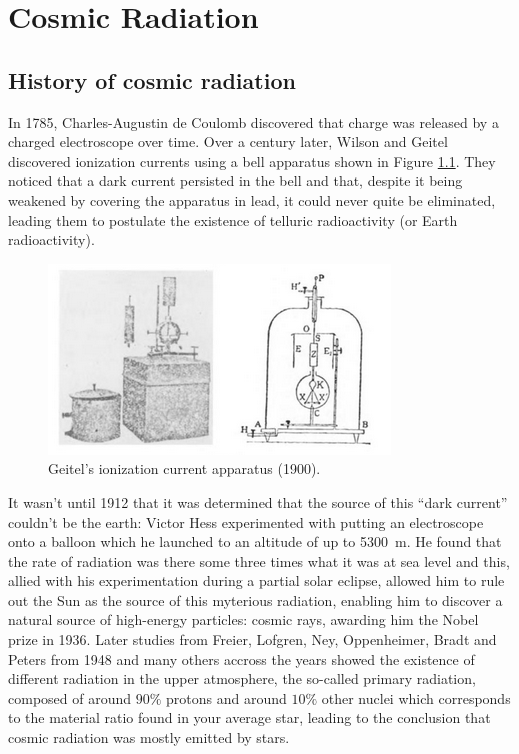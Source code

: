
\chapter{Cosmic Radiation}

\section{History of cosmic radiation}

In 1785, Charles-Augustin de Coulomb discovered that charge was released by a charged electroscope over time. Over a century later, Wilson and Geitel discovered ionization currents using a bell apparatus shown in Figure \ref{fig:bell}. They noticed that a dark current persisted in the bell and that, despite it being weakened by covering the apparatus in lead, it could never quite be eliminated, leading them to postulate the existence of telluric radioactivity (or Earth radioactivity).

\begin{figure}[htbp]
\centering
\includegraphics[width=0.6\linewidth]{./fig/bell.png}
\caption{Geitel's ionization current apparatus (1900).}
\label{fig:bell}
\end{figure}

It wasn't until 1912 that it was determined that the source of this ``dark current'' couldn't be the earth: Victor Hess experimented with putting an electroscope onto a balloon which he launched to an altitude of up to \SI{5300}{\meter}. He found that the rate of radiation was there some three times what it was at sea level and this, allied with his experimentation during a partial solar eclipse, allowed him to rule out the Sun as the source of this myterious radiation, enabling him to discover a natural source of high-energy particles: cosmic rays, awarding him the Nobel prize in 1936. Later studies from Freier, Lofgren, Ney, Oppenheimer, Bradt and Peters from 1948 and many others accross the years showed the existence of different radiation in the upper atmosphere, the so-called primary radiation, composed of around $90\%$ protons and around $10\%$ other nuclei which corresponds to the material ratio found in your average star, leading to the conclusion that cosmic radiation was mostly emitted by stars.

